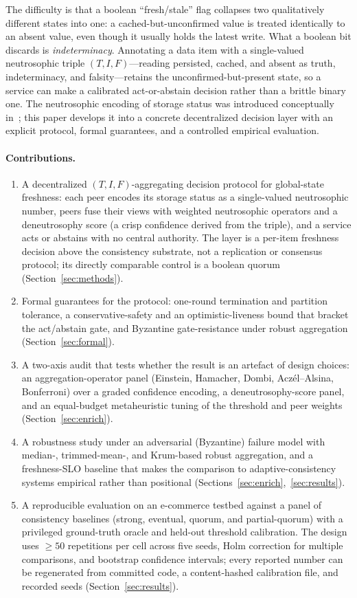 \documentclass[11pt]{article}
\begin{document}
The difficulty is that a boolean ``fresh/stale'' flag collapses two qualitatively different states into
one: a cached-but-unconfirmed value is treated identically to an absent value, even though it usually
holds the latest write. What a boolean bit discards is \emph{indeterminacy}. Annotating a data item
with a single-valued neutrosophic triple $(T,I,F)$---reading persisted, cached, and absent as truth,
indeterminacy, and falsity---retains the unconfirmed-but-present state, so a service can make a
calibrated act-or-abstain decision rather than a brittle binary one. The neutrosophic encoding of
storage status was introduced conceptually in~\cite{elghareeb2020neutro}; this paper develops it into a
concrete decentralized decision layer with an explicit protocol, formal guarantees, and a controlled
empirical evaluation.

\paragraph{Contributions.}
\begin{enumerate}
\item A decentralized $(T,I,F)$-aggregating decision protocol for global-state freshness: each peer
encodes its storage status as a single-valued neutrosophic number, peers fuse their views with
weighted neutrosophic operators and a deneutrosophy score (a crisp confidence derived from the triple),
and a service acts or abstains with no central authority. The layer is a per-item freshness decision
above the consistency substrate, not a replication or consensus protocol; its directly comparable
control is a boolean quorum (Section~\ref{sec:methods}).
\item Formal guarantees for the protocol: one-round termination and partition tolerance, a
conservative-safety and an optimistic-liveness bound that bracket the act/abstain gate, and Byzantine
gate-resistance under robust aggregation (Section~\ref{sec:formal}).
\item A two-axis audit that tests whether the result is an artefact of design choices: an
aggregation-operator panel (Einstein, Hamacher, Dombi, Acz\'el--Alsina, Bonferroni) over a graded
confidence encoding, a deneutrosophy-score panel, and an equal-budget metaheuristic tuning of the
threshold and peer weights (Section~\ref{sec:enrich}).
\item A robustness study under an adversarial (Byzantine) failure model with median-, trimmed-mean-,
and Krum-based robust aggregation, and a freshness-SLO baseline that makes the comparison to
adaptive-consistency systems empirical rather than positional (Sections~\ref{sec:enrich},~\ref{sec:results}).
\item A reproducible evaluation on an e-commerce testbed against a panel of consistency baselines
(strong, eventual, quorum, and partial-quorum) with a privileged ground-truth oracle and held-out
threshold calibration. The design uses $\geq 50$ repetitions per cell across five seeds, Holm correction
for multiple comparisons, and bootstrap confidence intervals; every reported number can be regenerated
from committed code, a content-hashed calibration file, and recorded seeds (Section~\ref{sec:results}).
\end{enumerate}
\end{document}
